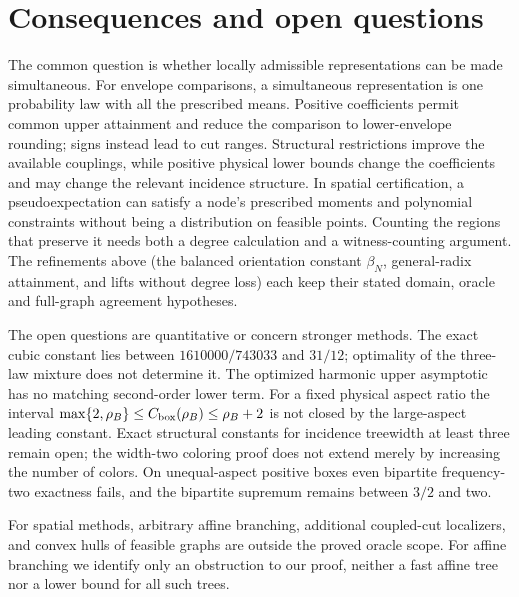 \section{Consequences and open questions}\label{sec:synthesis}
The common question is whether locally admissible representations can be
made simultaneous. For envelope comparisons, a simultaneous representation
is one probability law with all the prescribed means. Positive coefficients
permit common upper attainment and reduce the comparison to lower-envelope
rounding; signs instead lead to cut ranges. Structural restrictions improve
the available couplings, while positive physical lower bounds change the
coefficients and may change the relevant incidence structure. In spatial
certification, a pseudoexpectation can satisfy a node's prescribed moments
and polynomial constraints without being a distribution on feasible
points. Counting the regions that preserve it needs both a degree
calculation and a witness-counting argument. The refinements above (the
balanced orientation constant $\beta_N$, general-radix attainment, and
lifts without degree loss) each keep their stated domain, oracle and
full-graph agreement hypotheses.

The open questions are quantitative or concern stronger methods.
The exact cubic constant lies between $1610000/743033$ and $31/12$;
optimality of the three-law mixture does not determine it. The optimized
harmonic upper asymptotic has no matching second-order lower term. For a
fixed physical aspect ratio the interval
$\max\{2,\rho_B\}\le C_{\rm box}(\rho_B)\le\rho_B+2$ is not closed by
the large-aspect leading constant. Exact structural constants for incidence
treewidth at least three remain open; the width-two coloring proof does
not extend merely by increasing the number of colors. On unequal-aspect
positive boxes even bipartite frequency-two exactness fails, and the
bipartite supremum remains between $3/2$ and two.

For spatial methods, arbitrary affine branching, additional coupled-cut
localizers, and convex hulls of feasible graphs are outside the proved
oracle scope. For affine branching we identify only an obstruction to our
proof, neither a fast affine tree nor a lower bound for all such trees.

